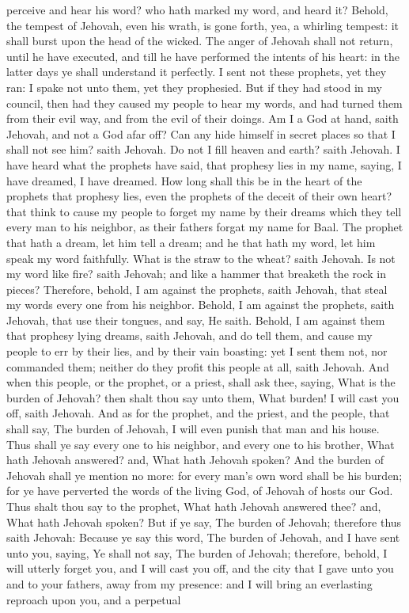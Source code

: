 perceive and hear his word? who hath marked my word, and heard it? Behold, the tempest of Jehovah, even his wrath, is gone forth, yea, a whirling tempest: it shall burst upon the head of the wicked. The anger of Jehovah shall not return, until he have executed, and till he have performed the intents of his heart: in the latter days ye shall understand it perfectly. I sent not these prophets, yet they ran: I spake not unto them, yet they prophesied. But if they had stood in my council, then had they caused my people to hear my words, and had turned them from their evil way, and from the evil of their doings.  Am I a God at hand, saith Jehovah, and not a God afar off? Can any hide himself in secret places so that I shall not see him? saith Jehovah. Do not I fill heaven and earth? saith Jehovah. I have heard what the prophets have said, that prophesy lies in my name, saying, I have dreamed, I have dreamed. How long shall this be in the heart of the prophets that prophesy lies, even the prophets of the deceit of their own heart? that think to cause my people to forget my name by their dreams which they tell every man to his neighbor, as their fathers forgat my name for Baal. The prophet that hath a dream, let him tell a dream; and he that hath my word, let him speak my word faithfully. What is the straw to the wheat? saith Jehovah. Is not my word like fire? saith Jehovah; and like a hammer that breaketh the rock in pieces? Therefore, behold, I am against the prophets, saith Jehovah, that steal my words every one from his neighbor. Behold, I am against the prophets, saith Jehovah, that use their tongues, and say, He saith. Behold, I am against them that prophesy lying dreams, saith Jehovah, and do tell them, and cause my people to err by their lies, and by their vain boasting: yet I sent them not, nor commanded them; neither do they profit this people at all, saith Jehovah.  And when this people, or the prophet, or a priest, shall ask thee, saying, What is the burden of Jehovah? then shalt thou say unto them, What burden! I will cast you off, saith Jehovah. And as for the prophet, and the priest, and the people, that shall say, The burden of Jehovah, I will even punish that man and his house. Thus shall ye say every one to his neighbor, and every one to his brother, What hath Jehovah answered? and, What hath Jehovah spoken? And the burden of Jehovah shall ye mention no more: for every man’s own word shall be his burden; for ye have perverted the words of the living God, of Jehovah of hosts our God. Thus shalt thou say to the prophet, What hath Jehovah answered thee? and, What hath Jehovah spoken? But if ye say, The burden of Jehovah; therefore thus saith Jehovah: Because ye say this word, The burden of Jehovah, and I have sent unto you, saying, Ye shall not say, The burden of Jehovah; therefore, behold, I will utterly forget you, and I will cast you off, and the city that I gave unto you and to your fathers, away from my presence: and I will bring an everlasting reproach upon you, and a perpetual 